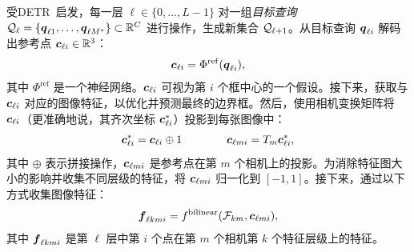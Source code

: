 受DETR~\cite{detr}启发，每一层 $\ell\in\{0,\ldots,L-1\}$ 对一组\emph{目标查询} $\mathcal{Q}_\ell=\{\boldsymbol{q}_{\ell 1}, \ldots, \boldsymbol{q}_{\ell M^*}\}\subset\mathbb{R}^{C}$ 进行操作，生成新集合 $\mathcal{Q}_{\ell+1}$。从目标查询 $\boldsymbol{q}_{\ell i}$ 解码出参考点 $\boldsymbol{c}_{\ell i}\in \mathbb{R}^3$：
\begin{equation}\label{eq:query-point}
    \begin{split}
      \boldsymbol{c}_{\ell i}=\Phi^{\mathrm{ref}}(\boldsymbol{q}_{\ell i}),
    \end{split}
\end{equation}
其中 $\Phi^{\mathrm{ref}}$ 是一个神经网络。$\boldsymbol{c}_{\ell i}$ 可视为第 $i$ 个框中心的一个假设。接下来，获取与 $\boldsymbol{c}_{\ell i}$ 对应的图像特征，以优化并预测最终的边界框。然后，使用相机变换矩阵将 $\boldsymbol{c}_{\ell i}$（更准确地说，其齐次坐标 $\boldsymbol{c}_{\ell i}^*$）投影到每张图像中：
\begin{equation}\label{eq:point-projection}
    \begin{split}
      \boldsymbol{c}_{\ell i}^* = \boldsymbol{c}_{\ell i} \oplus 1 \qquad\qquad \boldsymbol{c}_{\ell m i} = T_m \boldsymbol{c}_{\ell i}^*,
    \end{split}
\end{equation}
其中 $\oplus$ 表示拼接操作，$\boldsymbol{c}_{\ell m i}$ 是参考点在第 $m$ 个相机上的投影。为消除特征图大小的影响并收集不同层级的特征，将 $\boldsymbol{c}_{\ell m i}$ 归一化到 $[-1, 1]$。接下来，通过以下方式收集图像特征：
\begin{equation}\label{eq:bilinear}
    \begin{split}
        \boldsymbol{f}_{\ell k m i}  = f^{\mathrm{bilinear}}(\mathcal{F}_{km}, \boldsymbol{c}_{\ell m i}),
    \end{split}
\end{equation}
其中 $\boldsymbol{f}_{\ell k m i}$ 是第 $\ell$ 层中第 $i$ 个点在第 $m$ 个相机第 $k$ 个特征层级上的特征。

